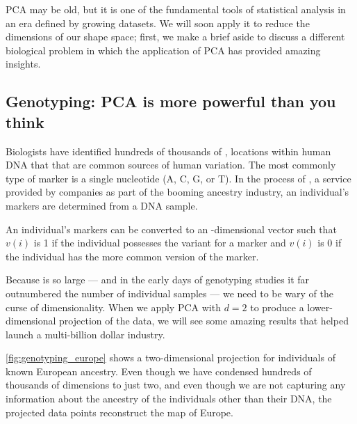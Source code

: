 \begin{note}[%
It can be shown that if $d_1$ is smaller than $d_2$, then the hyperplane provided by PCA of dimension $d_1$ is a subset of the hyperplane of dimension $d_2$. For example, the first principal component is always found within the plane ($d = 2$) provided by PCA.
]\end{note}

PCA may be old, but it is one of the fundamental tools of statistical analysis in an era defined by growing datasets. We will soon apply it to reduce the dimensions of our shape space; first, we make a brief aside to discuss a different biological problem in which the application of PCA has provided amazing insights.

\FloatBarrier
{}
\subsection{Genotyping: PCA is more powerful than you think}

Biologists have identified hundreds of thousands of , locations within human DNA that that are common sources of human variation. The most commonly type of marker is a single nucleotide (A, C, G, or T). In the process of , a service provided by companies as part of the booming ancestry industry, an individual's markers are determined from a DNA sample.

An individual's  markers can be converted to an -dimensional vector  such that $v(i)$ is 1 if the individual possesses the variant for a marker and $v(i)$ is 0 if the individual has the more common version of the marker.\\

\begin{note}\end{note}

Because  is so large --- and in the early days of genotyping studies it far outnumbered the number of individual samples --- we need to be wary of the curse of dimensionality. When we apply PCA with $d = 2$ to produce a lower-dimensional projection of the data, we will see some amazing results that helped launch a multi-billion dollar industry.

\autoref{fig:genotyping_europe} shows a two-dimensional projection for individuals of known European ancestry. Even though we have condensed hundreds of thousands of dimensions to just two, and even though we are not capturing any information about the ancestry of the individuals other than their DNA, the projected data points reconstruct the map of Europe.\\

